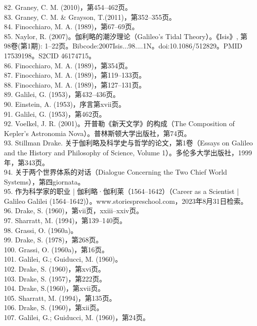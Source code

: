 82. Graney, C. M. (2010)，第454–462页。\\
83. Graney, C. M. & Grayson, T.(2011)，第352–355页。\\
84. Finocchiaro, M. A. (1989)，第67–69页。\\
85. Naylor, R. (2007)。伽利略的潮汐理论（Galileo's Tidal Theory）。《Isis》, 第98卷(第1期): 1–22页。Bibcode:2007Isis...98....1N。doi:10.1086/512829。PMID 17539198。S2CID 46174715。\\
86. Finocchiaro, M. A. (1989)，第354页。\\
87. Finocchiaro, M. A. (1989)，第119–133页。\\
88. Finocchiaro, M. A. (1989)，第127–131页。\\
89. Galilei, G. (1953)，第432–436页。\\
90. Einstein, A. (1953)，序言第xvii页。\\
91. Galilei, G. (1953)，第462页。\\
92. Voelkel, J. R. (2001)。开普勒《新天文学》的构成（The Composition of Kepler's Astronomia Nova）。普林斯顿大学出版社，第74页。\\
93. Stillman Drake. 关于伽利略及科学史与哲学的论文，第1卷（Essays on Galileo and the History and Philosophy of Science, Volume 1）。多伦多大学出版社，1999年，第343页。\\
94. 关于两个世界体系的对话（Dialogue Concerning the Two Chief World Systems），第四giornata。\\
95. 作为科学家的职业 | 伽利略·伽利莱（1564–1642）（Career as a Scientist | Galileo Galilei (1564–1642)）。www.storiespreschool.com，2023年8月31日检索。\\
96. Drake, S. (1960)，第vii页，xxiii–xxiv页。\\
97. Sharratt, M. (1994)，第139–140页。\\
98. Grassi, O. (1960a)。\\
99. Drake, S. (1978)，第268页。\\
100. Grassi, O. (1960a)，第16页。\\
101. Galilei, G.; Guiducci, M. (1960)。\\
102. Drake, S. (1960)，第xvi页。\\
103. Drake, S. (1957)，第222页。\\
104. Drake, S.(1960)，第xvii页。\\
105. Sharratt, M. (1994)，第135页。\\
106. Drake, S. (1960)，第xii页。\\
107. Galilei, G.; Guiducci, M. (1960)，第24页。\\
